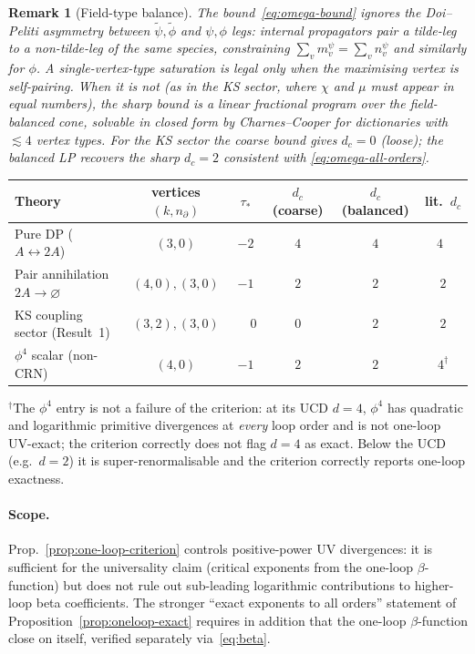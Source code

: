 \documentclass[11pt,a4paper]{article}
\newcommand{\psit}{\tilde\psi}
\newcommand{\phit}{\tilde\phi}
\theoremstyle{plain}
\newtheorem{remark}[theorem]{Remark}
\begin{document}
\begin{remark}[Field-type balance]
\label{rem:balance}
The bound~\eqref{eq:omega-bound} ignores the Doi--Peliti
asymmetry between $\psit,\phit$ and $\psi,\phi$ legs: internal
propagators pair a tilde-leg to a non-tilde-leg of the same
species, constraining $\sum_v m_v^\psi = \sum_v n_v^\psi$ and
similarly for $\phi$.  A single-vertex-type saturation is legal
only when the maximising vertex is \emph{self-pairing}.  When it
is not (as in the KS sector, where $\chi$ and $\mu$ must appear
in equal numbers), the sharp bound is a linear fractional program
over the field-balanced cone, solvable in closed form by
Charnes--Cooper for dictionaries with $\lesssim 4$ vertex types.
For the KS sector the coarse bound gives $d_c = 0$ (loose); the
balanced LP recovers the sharp $d_c = 2$ consistent with
\eqref{eq:omega-all-orders}.
\end{remark}

\begin{center}\small
\begin{tabular}{@{}lccccc@{}}\toprule
Theory & vertices $(k, n_\partial)$ & $\tau_\ast$
       & $d_c$ (coarse) & $d_c$ (balanced) & lit.\ $d_c$ \\ \midrule
Pure DP ($A\leftrightarrow 2A$) & $(3,0)$ & $-2$ & $4$ & $4$ & $4$~\citep{Tauber}\\
Pair annihilation $2A\to\varnothing$ & $(4,0),(3,0)$ & $-1$ & $2$ & $2$ & $2$\\
KS coupling sector (Result~1) & $(3,2),(3,0)$ & $\phantom{-}0$ & $0$ & $2$ & $2$\\
$\phi^4$ scalar (non-CRN) & $(4,0)$ & $-1$ & $2$ & $2$ & $4^\dagger$\\
\bottomrule\end{tabular}
\end{center}
\noindent$^\dagger$The $\phi^4$ entry is not a failure of the
criterion: at its UCD $d=4$, $\phi^4$ has quadratic and
logarithmic primitive divergences at \emph{every} loop order and
is not one-loop UV-exact; the criterion correctly does not flag
$d = 4$ as exact.  Below the UCD (e.g.\ $d = 2$) it is
super-renormalisable and the criterion correctly reports
one-loop exactness.

\paragraph{Scope.}
Prop.~\ref{prop:one-loop-criterion} controls positive-power UV
divergences: it is sufficient for the universality claim
(critical exponents from the one-loop $\beta$-function) but does
not rule out sub-leading logarithmic contributions to higher-loop
beta coefficients.  The stronger ``exact exponents to all orders''
statement of Proposition~\ref{prop:oneloop-exact} requires in
addition that the one-loop $\beta$-function close on itself,
verified separately via~\eqref{eq:beta}.
\end{document}
